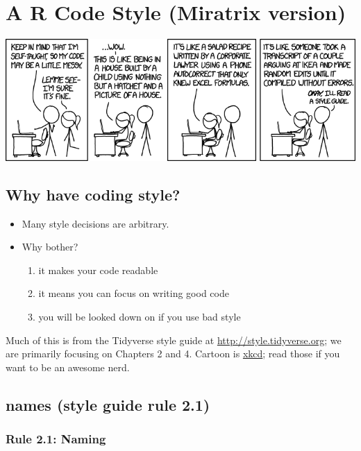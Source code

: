 \documentclass[
  letterpaper,
  DIV=11,
  numbers=noendperiod]{scrreprt}
\providecommand{\tightlist}{%
  \setlength{\itemsep}{0pt}\setlength{\parskip}{0pt}}\usepackage{longtable,booktabs,array}
\begin{document}
\chapter{A R Code Style (Miratrix
version)}\label{a-r-code-style-miratrix-version}

\includegraphics[width=1\textwidth,height=\textheight]{image/code_quality.png}

\section{Why have coding style?}\label{why-have-coding-style}

\begin{itemize}
\tightlist
\item
  Many style decisions are arbitrary.
\item
  Why bother?

  \begin{enumerate}
  \def\labelenumi{\arabic{enumi}.}
  \tightlist
  \item
    it makes your code readable
  \item
    it means you can focus on writing good code
  \item
    you will be looked down on if you use bad style
  \end{enumerate}
\end{itemize}

Much of this is from the Tidyverse style guide at
\url{http://style.tidyverse.org}; we are primarily focusing on Chapters
2 and 4. Cartoon is \href{https://xkcd.com/}{xkcd}; read those if you
want to be an awesome nerd.

\section{names (style guide rule 2.1)}\label{names-style-guide-rule-2.1}

\subsection{Rule 2.1: Naming}\label{rule-2.1-naming}
\end{document}
